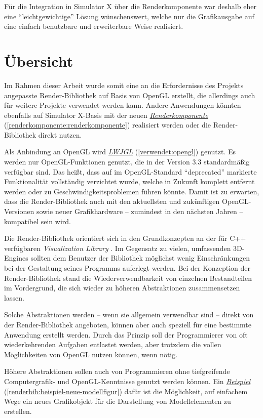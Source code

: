 \documentclass[a4paper,10pt]{sphinxmanual}
\begin{document}
Für die Integration in Simulator X über die Renderkomponente war deshalb eher eine "`leichtgewichtige"' Lösung wünschenswert, welche nur die Grafikausgabe auf eine einfach benutzbare und erweiterbare Weise realisiert.


\section{Übersicht}
\label{renderbib:ubersicht}
Im Rahmen dieser Arbeit wurde somit eine an die Erfordernisse des Projekts angepasste Render-Bibliothek auf Basis von OpenGL erstellt, die allerdings auch für weitere Projekte verwendet werden kann.
Andere Anwendungen könnten ebenfalls auf Simulator X-Basis mit der neuen {\hyperref[renderkomponente:renderkomponente]{\emph{Renderkomponente}}} (\autoref*{renderkomponente:renderkomponente}) realisiert werden oder die Render-Bibliothek direkt nutzen.

Als Anbindung an OpenGL wird {\hyperref[verwendet:opengl]{\emph{LWJGL}}} (\autoref*{verwendet:opengl}) genutzt.
Es werden nur OpenGL-Funktionen genutzt, die in der Version 3.3 standardmäßig verfügbar sind.
Das heißt, dass auf im OpenGL-Standard "`deprecated"' markierte Funktionalität vollständig verzichtet wurde, welche in Zukunft komplett entfernt werden oder zu Geschwindigkeitsproblemen führen könnte.
Damit ist zu erwarten, dass die Render-Bibliothek auch mit den aktuellsten und zukünftigen OpenGL-Versionen sowie neuer Grafikhardware – zumindest in den nächsten Jahren – kompatibel sein wird.

Die Render-Bibliothek orientiert sich in den Grundkonzepten an der für C++ verfügbaren \emph{Visualization Library} \cite{www:vislib}.
Im Gegensatz zu vielen, umfassenden 3D-Engines sollten dem Benutzer der Bibliothek möglichst wenig Einschränkungen bei der Gestaltung seines Programms auferlegt werden.
Bei der Konzeption der Render-Bibliothek stand die Wiederverwendbarkeit von einzelnen Bestandteilen im Vordergrund, die sich wieder zu höheren Abstraktionen zusammensetzen lassen.

Solche Abstraktionen werden – wenn sie allgemein verwendbar sind – direkt von der Render-Bibliothek angeboten, können aber auch speziell für eine bestimmte Anwendung erstellt werden.
Durch das Prinzip soll der Programmierer von oft wiederkehrenden Aufgaben entlastet werden, aber trotzdem die vollen Möglichkeiten von OpenGL nutzen können, wenn nötig.

Höhere Abstraktionen sollen auch von Programmieren ohne tiefgreifende Computergrafik- und OpenGL-Kenntnisse genutzt werden können.
Ein {\hyperref[renderbib:beispiel-neue-modellfigur]{\emph{Beispiel}}} (\autoref*{renderbib:beispiel-neue-modellfigur}) dafür ist die Möglichkeit, auf einfachem Wege ein neues Grafikobjekt für die Darstellung von Modellelementen zu erstellen.
\end{document}
